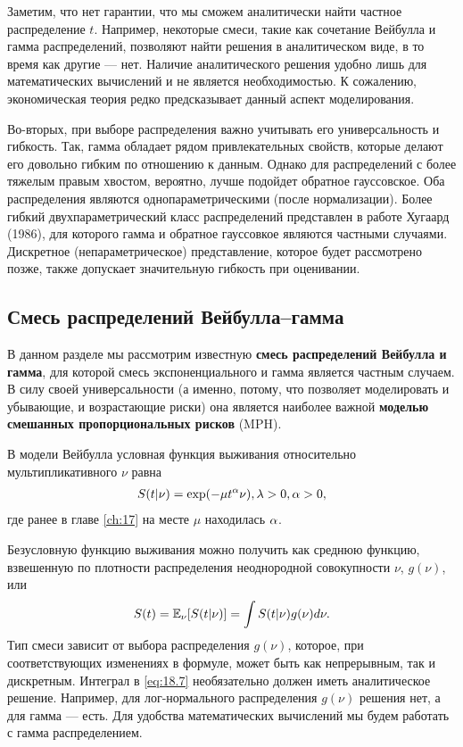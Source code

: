 Заметим, что нет гарантии, что мы сможем аналитически найти частное распределение $t$. Например, некоторые смеси, такие как сочетание Вейбулла и гамма распределений, позволяют найти решения в аналитическом виде, в то время как другие --- нет. Наличие аналитического решения удобно лишь для математических вычислений и не является необходимостью. %
К сожалению, экономическая теория редко предсказывает данный аспект моделирования.

Во-вторых, при выборе распределения важно учитывать его универсальность и гибкость. Так, гамма обладает рядом привлекательных свойств, которые делают его довольно гибким по отношению к данным. Однако для распределений с более тяжелым правым хвостом, вероятно, лучше подойдет обратное гауссовское. Оба распределения являются однопараметрическими (после нормализации). Более гибкий двухпараметрический класс распределений представлен в работе Хугаард (1986), для которого гамма и обратное гауссовкое являются частными случаями. Дискретное (непараметрическое) представление, %
которое будет рассмотрено позже, также допускает %
значительную гибкость при оценивании.


\subsection{Смесь распределений Вейбулла--гамма}\label{sec:18.2.3}

\noindent
В данном разделе мы рассмотрим известную \textbf{смесь распределений Вейбулла и гамма}, для которой смесь экспоненциального и гамма является частным случаем. В силу своей универсальности (а именно, потому, что позволяет моделировать и убывающие, и возрастающие риски) она является наиболее важной \textbf{моделью смешанных пропорциональных рисков} (MPH).

В модели Вейбулла условная функция выживания относительно мультипликативного $\nu$ равна
    \begin{align}
        \label{eq:18.6}
        S(t|\nu) = \exp(-\mu t^\alpha\nu), \lambda>0, \alpha>0,
    \end{align}
где ранее в главе \ref{ch:17} 
на месте $\mu$ находилась $\alpha$.

Безусловную функцию выживания можно получить как среднюю функцию, взвешенную по плотности распределения неоднородной совокупности $\nu$, $g(\nu)$, или
    \begin{align}
        \label{eq:18.7}
        S(t) = \mathbb{E}_\nu[S(t|\nu)] = \int S(t|\nu)g(\nu)d\nu.
    \end{align}
Тип смеси зависит от выбора распределения $g(\nu)$, которое, при соответствующих изменениях в формуле, может быть как непрерывным, так и дискретным. Интеграл в \ref{eq:18.7} необязательно должен иметь аналитическое решение. Например, для лог-нормального распределения $g(\nu)$ решения нет, а для гамма --- есть. Для удобства математических вычислений мы будем работать с гамма распределением.

